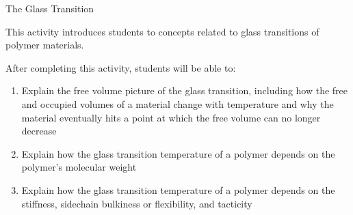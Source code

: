 %
%
%
%

\renewcommand{\figpath}{content/polymphys/thermal-transitions/Tg/figs}
\renewcommand{\labelbase}{Tg}

\begin{activity}{The Glass Transition}

\begin{instructornotes}
	This activity introduces students to concepts related to glass transitions of polymer materials.
	
	After completing this activity, students will be able to:
	\begin{enumerate}
		\item Explain the free volume picture of the glass transition, including how the free and occupied volumes of a material change with temperature and why the material eventually hits a point at which the free volume can no longer decrease
		\item Explain how the glass transition temperature of a polymer depends on the polymer's molecular weight
		\item Explain how the glass transition temperature of a polymer depends on the stiffness, sidechain bulkiness or flexibility, and tacticity
	\end{enumerate}
	

\end{instructornotes}
\end{activity}
